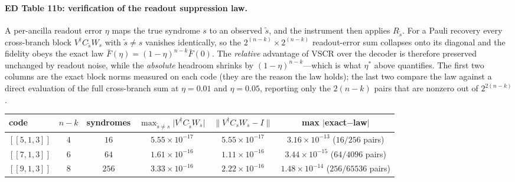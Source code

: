 \documentclass[10pt,a4paper]{article}
\begin{document}
\paragraph*{ED Table 11b: verification of the readout suppression law.}
A per-ancilla readout error $\eta$ maps the true syndrome $s$ to an observed
$\tilde s$, and the instrument then applies $R_{\tilde s}$. For a Pauli recovery
every cross-branch block $V^\dagger C_{\tilde s}W_s$ with $\tilde s\neq s$
vanishes identically, so the $2^{(n-k)}\times2^{(n-k)}$ readout-error sum
collapses onto its diagonal and the fidelity obeys the exact law
$\bar F(\eta)=(1-\eta)^{n-k}\bar F(0)$. The \emph{relative} advantage of VSCR over
the decoder is therefore preserved unchanged by readout noise, while the
\emph{absolute} headroom shrinks by $(1-\eta)^{n-k}$---which is what $\eta^\ast$
above quantifies. The first two columns are the exact block norms measured on
each code (they are the reason the law holds); the last two compare the law
against a direct evaluation of the full cross-branch sum at $\eta=0.01$ and
$\eta=0.05$, reporting only the $2(n-k)$ pairs that are nonzero out of
$2^{2(n-k)}$.
\begin{longtable}{lccccc}
\toprule code & $n{-}k$ & syndromes & $\max_{\tilde s\neq s}\lvert V^\dagger C_{\tilde s}W_s\rvert$ & $\lVert V^\dagger C_sW_s-I\rVert$ & max $\lvert$exact$-$law$\rvert$ \\ \midrule
$[\![5,1,3]\!]$ & $4$ & $16$ & $5.55\times 10^{-17}$ & $5.55\times 10^{-17}$ & $3.16\times 10^{-13}$ ($16/256$ pairs) \\
$[\![7,1,3]\!]$ & $6$ & $64$ & $1.61\times 10^{-16}$ & $1.11\times 10^{-16}$ & $3.44\times 10^{-15}$ ($64/4096$ pairs) \\
$[\![9,1,3]\!]$ & $8$ & $256$ & $3.33\times 10^{-16}$ & $2.22\times 10^{-16}$ & $1.48\times 10^{-14}$ ($256/65536$ pairs) \\
\bottomrule\end{longtable}
\end{document}
